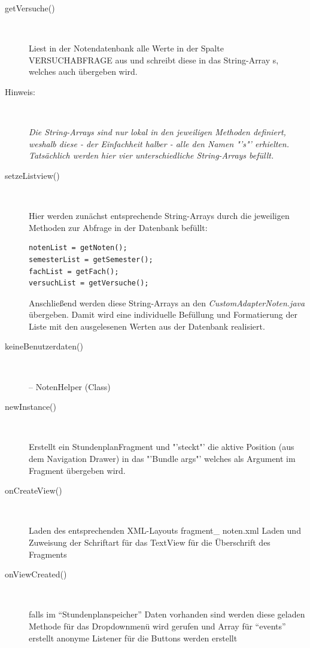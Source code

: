 \begin{description}
\item[getVersuche()]~\par
Liest in der Notendatenbank alle Werte in der Spalte \textcolor{lila}{VERSUCHABFRAGE} aus und schreibt diese in das String-Array s, welches auch übergeben wird.

\item[Hinweis:]~\par \textit{Die String-Arrays sind nur lokal in den jeweiligen Methoden definiert, weshalb diese - der Einfachheit halber - alle den Namen "'s"' erhielten. Tatsächlich werden hier vier unterschiedliche String-Arrays befüllt.}
 
\item[setzeListview()]~\par
Hier werden zunächst entsprechende String-Arrays durch die jeweiligen Methoden zur Abfrage in der Datenbank befüllt:
\begin{lstlisting}
notenList = getNoten();
semesterList = getSemester();
fachList = getFach();
versuchList = getVersuche();
\end{lstlisting}
Anschließend werden diese String-Arrays an den \textit{CustomAdapterNoten.java} übergeben. Damit wird eine individuelle Befüllung und Formatierung der Liste mit den ausgelesenen Werten aus der Datenbank realisiert.
 
\item[keineBenutzerdaten()]~\par
 
-- NotenHelper (Class)


\item[newInstance()]~\par
Erstellt ein StundenplanFragment und "'steckt"' die aktive Position (aus dem Navigation Drawer) in das "'Bundle args"' welches als Argument im Fragment übergeben wird.
 
\item[onCreateView()]~\par
Laden des entsprechenden XML-Layouts fragment\_ noten.xml
Laden und Zuweisung der Schriftart für das TextView für die Überschrift des Fragments

\item[onViewCreated()]~\par
falls im “Stundenplanspeicher” Daten vorhanden sind werden diese geladen
Methode für das Dropdownmenü wird gerufen und Array für “events” erstellt
anonyme Listener für die Buttons werden erstellt


\end{description}
